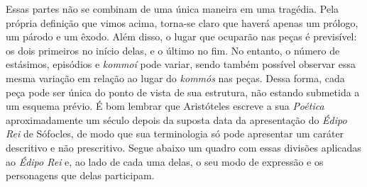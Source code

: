 Essas partes não se combinam de uma única maneira em uma tragédia. Pela
própria definição que vimos acima, torna-se claro que haverá apenas um
prólogo, um párodo e um êxodo. Além disso, o lugar que ocuparão nas
peças é previsível: os dois primeiros no início delas, e o último no
fim. No entanto, o número de estásimos, episódios e \emph{kommoí} pode
variar, sendo também possível observar essa mesma variação em relação ao
lugar do \emph{kommós} nas peças. Dessa forma, cada peça pode ser única
do ponto de vista de sua estrutura, não estando submetida a um esquema
prévio. É bom lembrar que Aristóteles escreve a sua \emph{Poética}
aproximadamente um século depois da suposta data da apresentação do
\emph{Édipo Rei} de Sófocles, de modo que sua terminologia só pode
apresentar um caráter descritivo e não prescritivo. Segue abaixo um
quadro com essas divisões aplicadas ao \emph{Édipo Rei} e, ao lado de
cada uma delas, o seu modo de expressão e os personagens que delas
participam.




